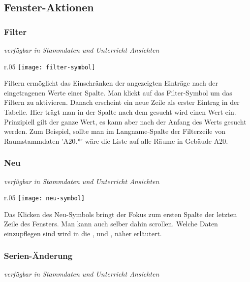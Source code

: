 \subsection{Fenster-Aktionen}

\subsubsection{Filter}
{\small\textit{verfügbar in Stammdaten und Unterricht Ansichten\\}\par}

\begin{wrapfigure}{r}{.05\textwidth}
	\vspace{-50pt}
	\texttt{[image: filter-symbol]}
	\vspace{-35pt}
\end{wrapfigure}

\noindent
Filtern ermöglicht das Einschränken der angezeigten Einträge nach der eingetragenen Werte einer Spalte. Man klickt auf das Filter-Symbol um das Filtern zu aktivieren. Danach erscheint ein neue Zeile als erster Eintrag in der Tabelle. Hier trägt man in der Spalte nach dem gesucht wird einen Wert ein. Prinzipiell gilt der ganze Wert, es kann aber nach der Anfang des Werts gesucht werden. Zum Beispiel, sollte man im Langname-Spalte der Filterzeile von Raumstammdaten 'A20.*' wäre die Liste auf alle Räume in Gebäude A20.

\subsubsection{Neu}
{\small\textit{verfügbar in Stammdaten und Unterricht Ansichten\\}\par}

\begin{wrapfigure}{r}{.05\textwidth}
	\vspace{-50pt}
	\texttt{[image: neu-symbol]}
	\vspace{-35pt}
\end{wrapfigure}

\noindent
Das Klicken des Neu-Symbols bringt der Fokus zum ersten Spalte der letzten Zeile des Fensters. Man kann auch selber dahin scrollen. Welche Daten einzupflegen sind wird in die , und , näher erläutert.\\

\subsubsection{Serien-Änderung}
{\small\textit{verfügbar in Stammdaten und Unterricht Ansichten\\}\par}

